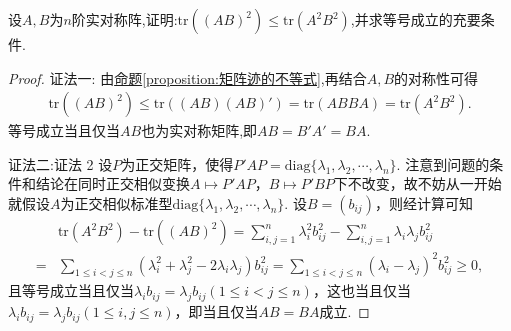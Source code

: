 \documentclass[../../main.tex]{subfiles}
\begin{document}
\begin{example}
设\(A,B\)为\(n\)阶实对称阵,证明:\(\text{tr}((AB)^2)\leq\text{tr}(A^2B^2)\),并求等号成立的充要条件.
\end{example}
\begin{proof}
{\color{blue}证法一:}
由\hyperref[proposition:矩阵迹的不等式]{命题\ref{proposition:矩阵迹的不等式}},再结合$A,B$的对称性可得
\begin{align*}
\mathrm{tr}\left( \left( AB \right) ^2 \right) \leqslant \mathrm{tr}\left( \left( AB \right) \left( AB \right) \prime \right) =\mathrm{tr}\left( ABBA \right) =\mathrm{tr}\left( A^2B^2 \right) .
\end{align*}
等号成立当且仅当$AB$也为实对称矩阵,即\(AB = B'A'=BA\).

{\color{blue}证法二:}证法 2 设\(P\)为正交矩阵，使得\(P'AP = \mathrm{diag}\{\lambda_1,\lambda_2,\cdots,\lambda_n\}\). 注意到问题的条件和结论在同时正交相似变换\(A\mapsto P'AP\)，\(B\mapsto P'BP\)下不改变，故不妨从一开始就假设\(A\)为正交相似标准型\(\mathrm{diag}\{\lambda_1,\lambda_2,\cdots,\lambda_n\}\). 设\(B=(b_{ij})\)，则经计算可知
\begin{align*}
&\mathrm{tr}(A^2B^2)-\mathrm{tr}((AB)^2)=\sum_{i,j = 1}^{n}\lambda_i^2b_{ij}^2-\sum_{i,j = 1}^{n}\lambda_i\lambda_jb_{ij}^2\\
=&\sum_{1\leq i<j\leq n}(\lambda_i^2+\lambda_j^2 - 2\lambda_i\lambda_j)b_{ij}^2=\sum_{1\leq i<j\leq n}(\lambda_i - \lambda_j)^2b_{ij}^2\geq0,
\end{align*}
且等号成立当且仅当\(\lambda_ib_{ij}=\lambda_jb_{ij}(1\leq i<j\leq n)\)，这也当且仅当\(\lambda_ib_{ij}=\lambda_jb_{ij}(1\leq i,j\leq n)\)，即当且仅当\(AB = BA\)成立. 
\end{proof}
\end{document}

